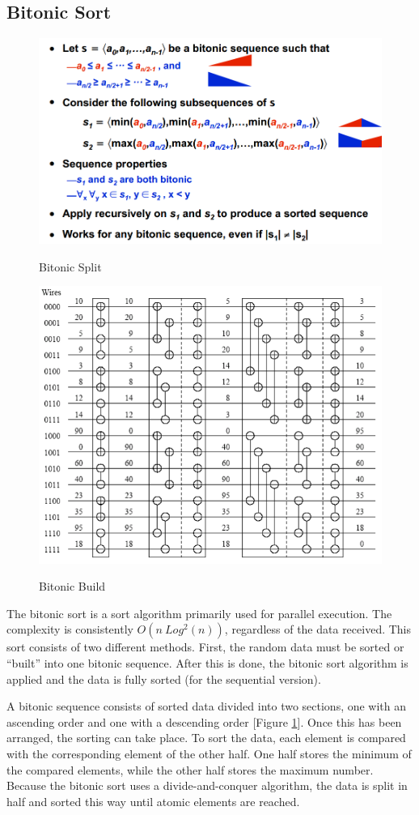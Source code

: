 \documentclass[journal]{IEEEtran}
\begin{document}

\subsection{Bitonic Sort}

	\begin{figure}[t!]
	\caption{Bitonic Split}
  \centering
	\includegraphics[width=.5\textwidth]{bitonic_split.png}
	\label{bitonic_split}
	\end{figure}
	
	\begin{figure}[t!]
	\caption{Bitonic Build}
  \centering
	\includegraphics[width=.5\textwidth]{bitonic_build_2.png}
	\label{bitonic_build}
	\end{figure}

The bitonic sort is a sort algorithm primarily used for parallel execution. The complexity is consistently  $O(n\ Log^2(n))$, regardless of the data received. This sort consists of two different methods.  First, the random data must be sorted or ``built'' into one bitonic sequence.  After this is done, the bitonic sort algorithm is applied and the data is fully sorted (for the sequential version).  

A bitonic sequence consists of sorted data divided into two sections, one with an ascending order and one with a descending order [Figure \ref{bitonic_split}].   Once this has been arranged, the sorting can take place.  To sort the data, each element is compared with the corresponding element of the other half. One half stores the minimum of the compared elements, while the other half stores the maximum number.  Because the bitonic sort uses a divide-and-conquer algorithm, the data is split in half and sorted this way until atomic elements are reached.  
\end{document}

